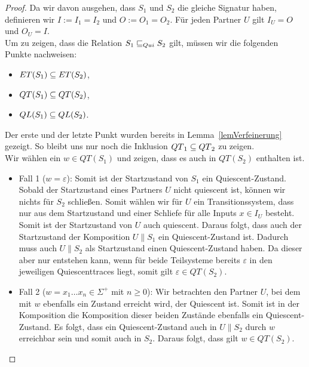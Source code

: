 \begin{proof}
  Da wir davon ausgehen, dass $S_1$ und $S_2$ die gleiche Signatur haben,
  definieren wir $I:=I_1=I_2$ und $O:=O_1=O_2$. Für jeden Partner $U$ gilt
  $I_U=O$ und $O_U=I$.\\
  Um zu zeigen, dass die Relation $S_1\sqsubseteq _{Qui} S_2$ gilt, müssen wir die
  folgenden Punkte nachweisen:
  \begin{itemize}
    \item $ET{}(S_1)\subseteq ET{}(S_2)$,
    \item $QT{}(S_1)\subseteq QT{}(S_2)$,
    \item $QL{}(S_1)\subseteq QL{}(S_2)$.
  \end{itemize}
  Der erste und der letzte Punkt wurden bereits in Lemma~\ref{lemVerfeinerung}
  gezeigt. So bleibt uns nur noch die Inklusion $QT{}_1\subseteq QT{}_2$ zu
  zeigen.\\
  Wir wählen ein $w\in QT(S_1)$ und zeigen, dass es auch in $QT(S_2)$ enthalten
  ist.
  \begin{itemize}
    \item Fall 1 ($w=\varepsilon$): Somit ist der Startzustand von $S_1$ ein
      Quiescent-Zustand. Sobald der Startzustand eines Partners $U$ nicht
      quiescent ist, können wir nichts für $S_2$ schließen. Somit wählen wir
      für $U$ ein Transitionssystem, dass nur aus dem Startzustand und einer
      Schliefe für alle Inputs $x\in I_U$ besteht. Somit ist der Startzustand
      von $U$ auch quiescent. Daraus folgt, dass auch der Startzustand der
      Komposition $U\|S_1$ ein Quiescent-Zustand ist. Dadurch muss auch
      $U\|S_2$ als Startzustand einen Quiescent-Zustand haben. Da dieser aber
      nur entstehen kann, wenn für beide Teilsysteme bereits $\varepsilon$ in
      den jeweiligen Quiescenttraces liegt, somit gilt $\varepsilon\in
      QT(S_2)$.
    \item Fall 2 ($w=x_1\dots x_n\in\Sigma ^+$ mit $n\geq 0$): Wir betrachten
      den Partner $U$, bei dem mit $w$ ebenfalls ein Zustand erreicht wird, der
      Quiescent ist. Somit ist in der Komposition die Komposition dieser
      beiden Zustände ebenfalls ein Quiescent-Zustand. Es folgt, dass ein
      Quiescent-Zustand auch in $U\|S_2$ durch $w$ erreichbar sein und somit
      auch in $S_2$. Daraus folgt, dass gilt $w\in QT(S_2)$.
  \end{itemize}
\end{proof}
